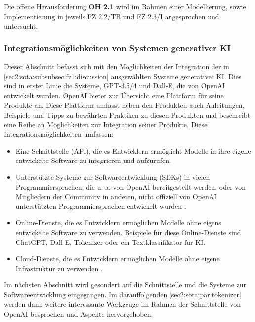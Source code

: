 Die offene Herausforderung \textbf{OH 2.1} wird im Rahmen einer Modellierung, sowie Implementierung in jeweils \hyperref[sec3:model:subsec:fz-integration]{FZ 2.2/TB} und \hyperref[sec4:impl:subsec:fz-integration]{FZ 2.3/I} angesprochen und untersucht.

\subsubsection{Integrationsmöglichkeiten von Systemen generativer KI}
\label{sec2:sota:subsubsec:genai-capabilities-integration}
Dieser Abschnitt befasst sich mit den Möglichkeiten der Integration der in \cref{sec2:sota:subsubsec:fz1:discussion} ausgewählten Systeme generativer KI.
Dies sind in erster Linie die Systeme, GPT-3.5/4 und Dall-E, die von OpenAI entwickelt wurden.
OpenAI bietet zur Übersicht eine Plattform für seine Produkte an.
Diese Plattform umfasst neben den Produkten auch Anleitungen, Beispiele und Tipps zu bewährten Praktiken zu diesen Produkten und beschreibt eine Reihe an Möglichkeiten zur Integration seiner Produkte.
Diese Integrationsmöglichkeiten umfassen:
\begin{itemize}
    \item Eine Schnittstelle (API), die es Entwicklern ermöglicht Modelle in ihre eigene entwickelte Software zu integrieren und aufzurufen.
    \item Unterstützte Systeme zur Softwareentwicklung (SDKs) in vielen Programmiersprachen, die u. a. von OpenAI bereitgestellt werden, oder von Mitgliedern der Community in anderen, nicht offiziell von OpenAI unterstützten Programmiersprachen entwickelt wurden \cite{openai-community-library}.
    \item Online-Dienste, die es Entwicklern ermöglichen Modelle ohne eigens entwickelte Software zu verwenden.
    Beispiele für diese Online-Dienste sind ChatGPT, Dall-E, Tokenizer oder ein Textklassifikator für KI.
    \item Cloud-Dienste, die es Entwicklern ermöglichen Modelle ohne eigene Infrastruktur zu verwenden \cite{openai-cloud-services}.
\end{itemize}
Im nächsten Abschnitt wird gesondert auf die Schnittstelle und die Systeme zur Softwareentwicklung eingegangen.
Im darauffolgenden \cref{sec2:sota:par:tokenizer} werden dann weitere interessante Werkzeuge im Rahmen der Schnittstelle von OpenAI besprochen und Aspekte hervorgehoben.

